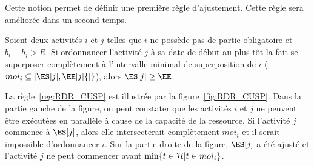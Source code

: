 Cette notion permet de définir une première règle d'ajustement. Cette
règle sera améliorée dans un second temps. 

\begin{reg}
\label{reg:RDR_CUSP}
  Soient deux activités $i$ et $j$ telles que $i$ ne possède pas de
  partie obligatoire et $b_i+b_j > R$. Si ordonnancer l'activité
 $j$ à sa date de début au plus tôt la fait se superposer complètement
 à l’intervalle minimal de superposition de $i$ ($moi_i \subseteq
 [\ES[j],\EE[j]{]}$), alors $\ES[j] \ge \EE$.
\end{reg}

\begin{ex}
La règle~\ref{reg:RDR_CUSP} est illustrée par la
figure~\ref{fig:RDR_CUSP}. Dans la partie gauche de la figure, on
peut constater que les activités $i$ et $j$ ne peuvent être exécutées
en parallèle à cause de la capacité de la ressource. Si l'activité $j$
commence à $\ES[j]$, alors elle intersecterait complètement $moi_i$ et
il serait impossible d'ordonnancer $i$. Sur la partie droite de la
figure, $\ES[j]$ a été ajusté et l'activité $j$ ne peut commencer
avant $\min\{t \in {\cal H}|t \in moi_i \}$.
  \begin{figure}[!htb]
    \centering
\end{figure}
\end{ex}
